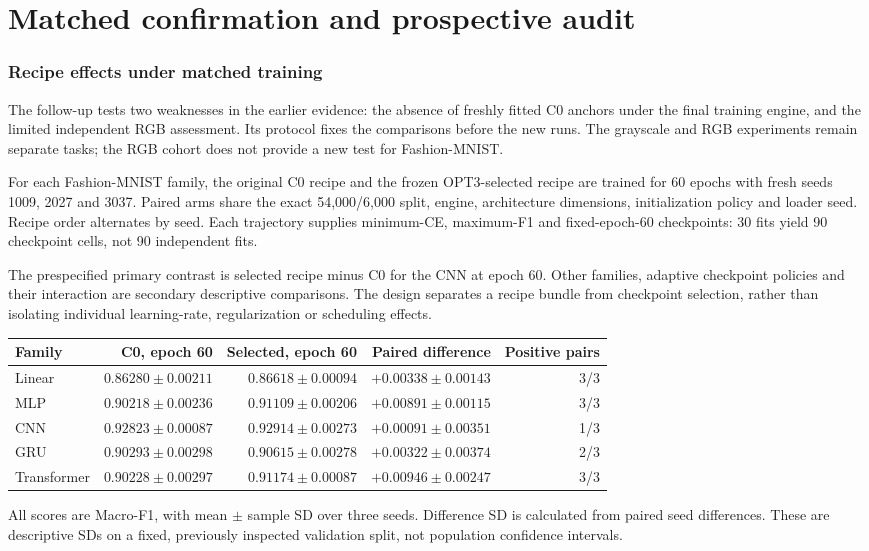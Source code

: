 \clearpage
\part{Matched confirmation and prospective audit}
\section{Recipe effects under matched training}\label{sec:matched-confirmation}\label{sec:matched-followup}
The follow-up tests two weaknesses in the earlier evidence: the absence of freshly fitted C0 anchors under the final training engine, and the limited independent RGB assessment. Its protocol fixes the comparisons before the new runs. The grayscale and RGB experiments remain separate tasks; the RGB cohort does not provide a new test for Fashion-MNIST.

For each Fashion-MNIST family, the original C0 recipe and the frozen OPT3-selected recipe are trained for 60 epochs with fresh seeds 1009, 2027 and 3037. Paired arms share the exact 54,000/6,000 split, engine, architecture dimensions, initialization policy and loader seed. Recipe order alternates by seed. Each trajectory supplies minimum-CE, maximum-F1 and fixed-epoch-60 checkpoints: 30 fits yield 90 checkpoint cells, not 90 independent fits.

The prespecified primary contrast is selected recipe minus C0 for the CNN at epoch 60. Other families, adaptive checkpoint policies and their interaction are secondary descriptive comparisons. The design separates a recipe bundle from checkpoint selection, rather than isolating individual learning-rate, regularization or scheduling effects.

\begin{center}\small
\setlength{\tabcolsep}{4pt}
\begin{tabular}{lrrrr}\toprule
Family & C0, epoch 60 & Selected, epoch 60 & Paired difference & Positive pairs\\\midrule
Linear & $0.86280\pm0.00211$ & $0.86618\pm0.00094$ & $+0.00338\pm0.00143$ & 3/3\\
MLP & $0.90218\pm0.00236$ & $0.91109\pm0.00206$ & $+0.00891\pm0.00115$ & 3/3\\
CNN & $0.92823\pm0.00087$ & $0.92914\pm0.00273$ & $+0.00091\pm0.00351$ & 1/3\\
GRU & $0.90293\pm0.00298$ & $0.90615\pm0.00278$ & $+0.00322\pm0.00374$ & 2/3\\
Transformer & $0.90228\pm0.00297$ & $0.91174\pm0.00087$ & $+0.00946\pm0.00247$ & 3/3\\\bottomrule
\end{tabular}\end{center}
All scores are Macro-F1, with mean $\pm$ sample SD over three seeds. Difference SD is calculated from paired seed differences. These are descriptive SDs on a fixed, previously inspected validation split, not population confidence intervals.

